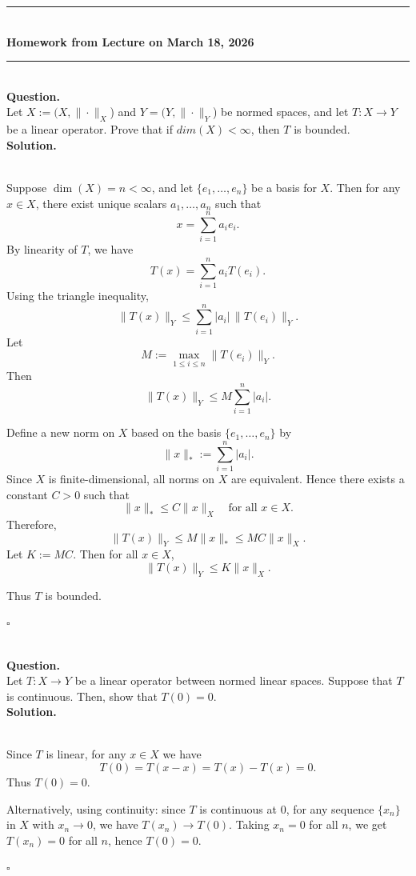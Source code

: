 \documentclass{article}
\begin{document}
\bigskip
\begin{center}
\rule{0.5\textwidth}{1pt}\\[6pt]
\textbf{Homework from Lecture on March 18, 2026}\\[2pt]
\rule{0.5\textwidth}{1pt}
\end{center}
\bigskip

\hfill \break  $~\!\!$ \dotfill \medskip \\
\textbf{Question.}\\
Let $X := (X, \|\cdot \|_X$) and $Y= (Y, \|\cdot \|_Y$) be normed spaces, and let $T: X\rightarrow Y$ be a linear operator. Prove that if $dim(X)<\infty$, then $T$ is bounded.
\noindent\\
\textbf{Solution.}\\
\quad\\
\begin{mdframed}[linewidth=1pt]
Suppose $\dim(X) = n < \infty$, and let $\{e_1, \dots, e_n\}$ be a basis for $X$. Then for any $x \in X$, there exist unique scalars $a_1, \dots, a_n$ such that
\[
x = \sum_{i=1}^n a_i e_i.
\]
By linearity of $T$, we have
\[
T(x) = \sum_{i=1}^n a_i T(e_i).
\]
Using the triangle inequality,
\[
\|T(x)\|_Y \le \sum_{i=1}^n |a_i| \, \|T(e_i)\|_Y.
\]
Let
\[
M := \max_{1 \le i \le n} \|T(e_i)\|_Y.
\]
Then
\[
\|T(x)\|_Y \le M \sum_{i=1}^n |a_i|.
\]

Define a new norm on $X$ based on the basis $\{e_1, \dots, e_n\}$ by
\[
\|x\|_* := \sum_{i=1}^n |a_i|.
\]
Since $X$ is finite-dimensional, all norms on $X$ are equivalent. Hence there exists a constant $C > 0$ such that
\[
\|x\|_* \le C \|x\|_X \quad \text{for all } x \in X.
\]
Therefore,
\[
\|T(x)\|_Y \le M \|x\|_* \le MC \|x\|_X.
\]
Let $K := MC$. Then for all $x \in X$,
\[
\|T(x)\|_Y \le K \|x\|_X.
\]

Thus $T$ is bounded.

\hfill $\square$

\end{mdframed}

\bigskip

\hfill \break  $~\!\!$ \dotfill \medskip \\
\textbf{Question.}\\
Let $T: X\rightarrow Y$ be a linear operator between normed linear spaces. Suppose that $T$ is continuous. Then, show that $T(0)=0$.
\noindent\\
\textbf{Solution.}\\
\quad\\
\begin{mdframed}[linewidth=1pt]
Since $T$ is linear, for any $x \in X$ we have
\[
T(0) = T(x - x) = T(x) - T(x) = 0.
\]
Thus $T(0) = 0$.

\medskip

Alternatively, using continuity: since $T$ is continuous at $0$, for any sequence $\{x_n\}$ in $X$ with $x_n \to 0$, we have $T(x_n) \to T(0)$. Taking $x_n = 0$ for all $n$, we get $T(x_n) = 0$ for all $n$, hence $T(0) = 0$.

\hfill $\square$
\end{mdframed}
\end{document}
